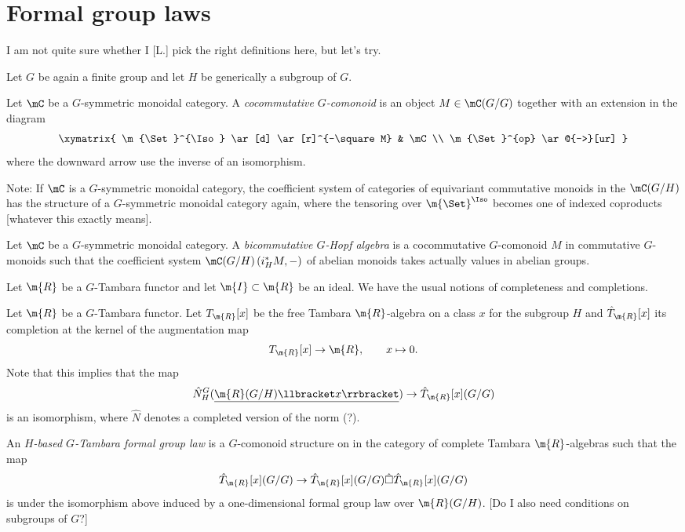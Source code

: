 \documentclass[11pt]{article}
\begin{document}
\section{Formal group laws}
I am not quite sure whether I [L.] pick the right definitions here, but let's try. 

Let $G$ be again a finite group and let $H$ be generically a subgroup of $G$. 
\begin{defi}
Let $\mC$ be a $G$-symmetric monoidal category. A \emph{cocommutative $G$-comonoid} is an object $M \in \mC(G/G)$ together with an extension in the diagram
\[
\xymatrix{
\m{\Set}^{\Iso} \ar[d] \ar[r]^{-\square M} & \mC\\
\m{\Set}^{op} \ar@{-->}[ur]
}
\]
where the downward arrow use the inverse of an isomorphism.
\end{defi}

Note: If $\mC$ is a $G$-symmetric monoidal category, the coefficient system of categories of equivariant commutative monoids in the $\mC(G/H)$ has the structure of a $G$-symmetric monoidal category again, where the tensoring over $\m{\Set}^{\Iso}$ becomes one of indexed coproducts [whatever this exactly means].

\begin{defi}
Let $\mC$ be a $G$-symmetric monoidal category. A \emph{bicommutative $G$-Hopf algebra} is a cocommutative $G$-comonoid $M$ in commutative $G$-monoids such that the coefficient system $\mC(G/H)\left(i^*_HM, -\right)$ of abelian monoids takes actually values in abelian groups. 
\end{defi}

Let $\m{R}$ be a $G$-Tambara functor and let $\m{I}\subset \m{R}$ be an ideal. We have the usual notions of completeness and completions. 

\begin{defi}
Let $\m{R}$ be a $G$-Tambara functor. Let $T_{\m{R}}[x]$ be the free Tambara $\m{R}$-algebra on a class $x$ for the subgroup $H$ and $\hat{T}_{\m{R}}[x]$ its completion at the kernel of the augmentation map 
$$T_{\m{R}}[x] \to \m{R},\qquad x\mapsto 0.$$ 
Note that this implies that the map
$$\hat{N}_H^G(\underline{\m{R}(G/H)\llbracket x \rrbracket}) \to \hat{T}_{\m{R}}[x](G/G)$$
is an isomorphism, where $\hat{N}$ denotes a completed version of the norm (?). 

An \emph{$H$-based $G$-Tambara formal group law} is a $G$-comonoid structure on in the category of complete Tambara $\m{R}$-algebras such that 
the map 
$$\hat{T}_{\m{R}}[x](G/G) \to \hat{T}_{\m{R}}[x](G/G) \hat{\Box} \hat{T}_{\m{R}}[x](G/G)$$
is under the isomorphism above induced by a one-dimensional formal group law over $\m{R}(G/H)$. [Do I also need conditions on subgroups of $G$?]
\end{defi}
\end{document}
